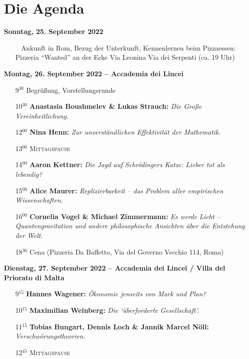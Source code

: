 \chapter*{Die Agenda}
\begin{description}
\item {\textbf{Sonntag, 25. September 2022}}
\begin{itemize}
\item[~] {Ankunft in Rom, Bezug der Unterkunft, Kennenlernen beim Pizzaessen: 
   Pizzeria ``Wanted'' an der Ecke Via Leonina Via dei Serpenti} (ca. 19 Uhr)
\end{itemize}
\smallskip


\item {\textbf{Montag, 26. September 2022 -- Accademia dei Lincei}}
\begin{itemize}
\item[ 9$^{30}$] { Begr\"u{\ss}ung, Vorstellungsrunde}
\item[10$^{30}$] {\textbf{Anastasia Boushmelev \& Lukas Strauch:}} {\emph{Die Große Vereinheitlichung.}}
\item[12$^{00}$] {\textbf{Nina Henn:}} {\emph{Zur unverständlichen Effektivität der Mathematik.}}
\item[13$^{00}$] \hfill {\textsc{Mittagspause}} \hfill ~
\item[14$^{00}$] {\textbf{Aaron Kettner:}} {\emph{Die Jagd auf Schrödingers Katze: Lieber tot als lebendig?}}
\item[15$^{00}$] {\textbf{Alice Maurer:}} {\emph{Replizierbarkeit -- das Problem aller empirischen Wissenschaften.}}
\item[16$^{00}$] {\textbf{ Cornelia Vogel \& Michael Zimmermann:}} {\emph{Es werde Licht – Quantengravitation 
  und andere philosophische Ansichten über die Entstehung der Welt.}}
\item[18$^{30}$] \hfill {Cena (Pizzeria Da Baffetto, Via del Governo Vecchio 114, Roma)}  \hfill ~
\end{itemize}
\smallskip




\item {\textbf{Dienstag, 27. September 2022 -- Accademia dei Lincei / Villa del Priorato di Malta}}
\begin{itemize}
\item[9$^{15}$] {\textbf{Hannes Wagener:}} {\emph{Ökonomie jenseits von Mark und Plan?}}
\item[10$^{15}$] {\textbf{Maximilian Weinberg:}} {\emph{Die `überforderte Gesellschaft'.}}
\item[11$^{15}$] {\textbf{Tobias Bungart, Dennis Loch \& Jannik Marcel Nöll:}}  {\emph{Verschwörungstheorien.}}
\item[12$^{45}$] \hfill {\textsc{Mittagspause}}\hfill ~


\end{itemize}
\end{description}
